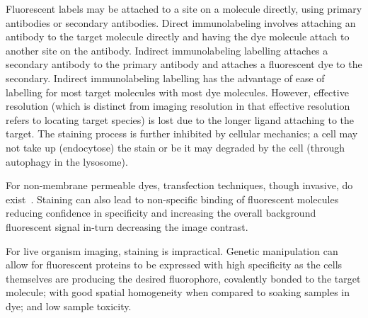 Fluorescent labels may be attached to a site on a molecule directly, using primary antibodies or secondary antibodies.
Direct immunolabeling involves attaching an antibody to the target molecule directly and having the dye molecule attach to another site on the antibody.
Indirect immunolabeling labelling attaches a secondary antibody to the primary antibody and attaches a fluorescent dye to the secondary.
Indirect immunolabeling labelling has the advantage of ease of labelling for most target molecules with most dye molecules.
However, effective resolution (which is distinct from imaging resolution in that effective resolution refers to locating target species) is lost due to the longer ligand attaching to the target.%
The staining process is further inhibited by cellular mechanics; a cell may not take up (endocytose) the stain or be it may degraded by the cell (through \gls{autophagy} in the \gls{lysosome}).

For non-membrane permeable dyes, \gls{transfection} techniques, though invasive, do exist~\cite{kimMammalianCellTransfection2010}.
Staining can also lead to non-specific binding of fluorescent molecules reducing confidence in specificity and increasing the overall background fluorescent signal in-turn decreasing the image contrast.

For live organism imaging, staining is impractical.
Genetic manipulation can allow for fluorescent proteins to be expressed with high specificity as the cells themselves are producing the desired fluorophore, covalently bonded to the target molecule; with good spatial homogeneity when compared to soaking samples in dye; and low sample toxicity.



%
%

